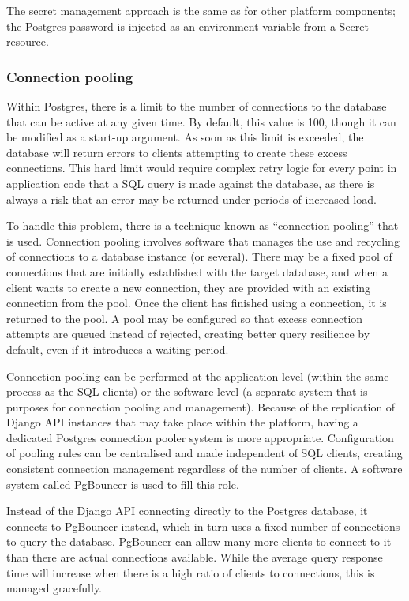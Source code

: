 The secret management approach is the same as for other platform components; the Postgres password is injected as an environment variable from a Secret resource.

\subsubsection{Connection pooling}

Within Postgres, there is a limit to the number of connections to the database that can be active at any given time. By default, this value is 100, though it can be modified as a start-up argument. As soon as this limit is exceeded, the database will return errors to clients attempting to create these excess connections. This hard limit would require complex retry logic for every point in application code that a SQL query is made against the database, as there is always a risk that an error may be returned under periods of increased load.

To handle this problem, there is a technique known as ``connection pooling'' that is used. Connection pooling involves software that manages the use and recycling of connections to a database instance (or several). There may be a fixed pool of connections that are initially established with the target database, and when a client wants to create a new connection, they are provided with an existing connection from the pool. Once the client has finished using a connection, it is returned to the pool. A pool may be configured so that excess connection attempts are queued instead of rejected, creating better query resilience by default, even if it introduces a waiting period.

Connection pooling can be performed at the application level (within the same process as the SQL clients) or the software level (a separate system that is purposes for connection pooling and management). Because of the replication of Django API instances that may take place within the platform, having a dedicated Postgres connection pooler system is more appropriate. Configuration of pooling rules can be centralised and made independent of SQL clients, creating consistent connection management regardless of the number of clients. A software system called PgBouncer is used to fill this role.

Instead of the Django API connecting directly to the Postgres database, it connects to PgBouncer instead, which in turn uses a fixed number of connections to query the database. PgBouncer can allow many more clients to connect to it than there are actual connections available. While the average query response time will increase when there is a high ratio of clients to connections, this is managed gracefully.

